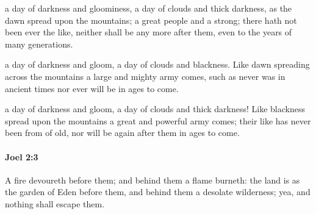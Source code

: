 			\begin{versebox}
					\item[BHS] 
					\item[LXX] 
					\item[ASV] a day of darkness and gloominess, a day of clouds and thick darkness, as the dawn spread upon the mountains; a great people and a strong; there hath not been ever the like, neither shall be any more after them, even to the years of many generations.
					\item[NIV] a day of darkness and gloom, a day of clouds and blackness. Like dawn spreading across the mountains a large and mighty army comes, such as never was in ancient times nor ever will be in ages to come.
					\item[NRSV] a day of darkness and gloom, a day of clouds and thick darkness! Like blackness spread upon the mountains a great and powerful army comes; their like has never been from of old, nor will be again after them in ages to come.
			\end{versebox}

		\paragraph{Joel 2:3} %
			\label{JOEL-2-3}

			A fire devoureth before them; and behind them a flame burneth: the land is as the garden of Eden before them, and behind them a desolate wilderness; yea, and nothing shall escape them.


